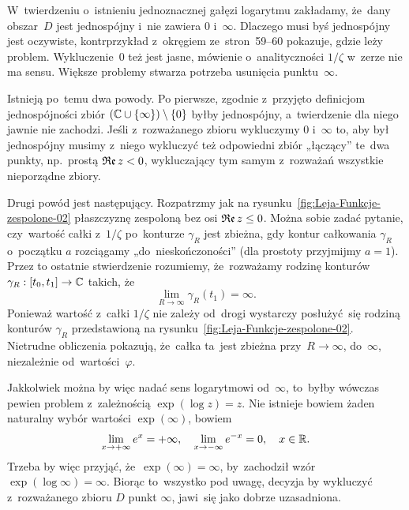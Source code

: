 \documentclass[a4paper,11pt]{article}
\numberwithin{equation}{section}
\begin{document}
\noindent
{} W~twierdzeniu o~istnieniu jednoznacznej gałęzi logarytmu
zakładamy, że~dany obszar~$D$ jest jednospójny i~nie zawiera
$0$ i~$\infty$. Dlaczego musi byś jednospójny jest oczywiste,
kontrprzykład z~okręgiem ze~stron~59--60 pokazuje, gdzie leży problem.
Wykluczenie~$0$ też jest jasne, mówienie o~analityczności $1 / \zeta$
w~zerze nie ma sensu. Większe problemy stwarza potrzeba usunięcia
punktu~$\infty$.

Istnieją po~temu dwa powody. Po pierwsze, zgodnie z~przyjęto definicjom
jednospójności zbiór $( \mathbb{C} \cup \{ \infty \} ) \setminus \{ 0 \}$ byłby jednospójny,
a~twierdzenie dla niego jawnie nie zachodzi. Jeśli z~rozważanego zbioru
wykluczymy $0$ i~$\infty$ to, aby był jednospójny musimy z~niego wykluczyć też
odpowiedni zbiór „łączący” te~dwa punkty, np.~prostą $\operatorname{\mathfrak{Re}} z < 0$,
wykluczający tym samym z~rozważań wszystkie nieporządne zbiory.

Drugi powód jest następujący. Rozpatrzmy jak na
rysunku~\eqref{fig:Leja-Funkcje-zespolone-02} płaszczyznę zespoloną bez osi
$\operatorname{\mathfrak{Re}} z \leq 0$. Można sobie zadać pytanie, czy~wartość całki z~$1 / \zeta$
po~konturze $\gamma_{ R }$ jest zbieżna, gdy kontur całkowania $\gamma_{ R }$
o~początku $a$ rozciągamy „do~nieskończoności” (dla prostoty przyjmijmy
$a = 1$). Przez to ostatnie stwierdzenie rozumiemy, że~rozważamy rodzinę
konturów $\gamma_{ R }: [ t_{ 0 }, t_{ 1 } ] \to \mathbb{C}$ takich, że
\begin{equation}
  \label{eq:Leja-Funkcje-zespolone-39}
  \lim_{ R \to \infty } \gamma_{ R }( t_{ 1 } ) = \infty.
\end{equation}
Ponieważ wartość z~całki $1 / \zeta$ nie zależy od~drogi wystarczy
posłużyć~się rodziną konturów $\gamma_{ R }$ przedstawioną na
rysunku~\eqref{fig:Leja-Funkcje-zespolone-02}. Nietrudne obliczenia
pokazują, że~całka ta~jest zbieżna przy~$R \to \infty$, do~$\infty$, niezależnie
od~wartości~$\varphi$.

Jakkolwiek można by więc nadać sens logarytmowi od~$\infty$, to~byłby
wówczas pewien problem z~zależnością $\exp( \log z ) = z$. Nie
istnieje bowiem żaden naturalny wybór wartości $\exp( \infty )$, bowiem
\begin{equation}
  \label{eq:Leja-Funkcje-zespolone-40}
  \lim\limits_{ x \to +\infty } e^{ x } = +\infty, \quad
  \lim\limits_{ x \to -\infty } e^{ -x } = 0, \quad
  x \in \mathbb{R}.
\end{equation}
Trzeba by więc przyjąć, że~$\exp( \infty ) = \infty$, by~zachodził wzór
$\exp( \log \infty ) = \infty$. Biorąc to~wszystko pod uwagę, decyzja
by wykluczyć z~rozważanego zbioru $D$ punkt $\infty$, jawi~się jako
dobrze uzasadniona.
\end{document}
